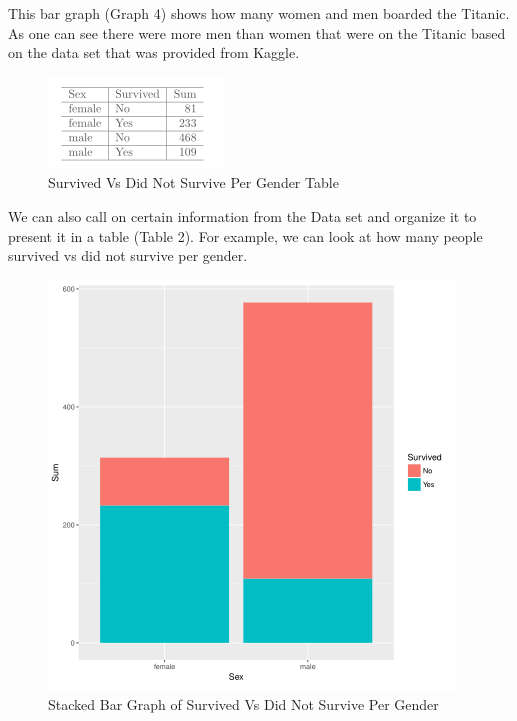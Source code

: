 \documentclass[sigconf]{acmart}
\begin{document}
This bar graph (Graph 4) shows how many women and men boarded the Titanic. As one can see there were more men than women that were on the Titanic based on the data set that was provided from Kaggle.

\begin{figure}[htb]
  \centering
  \includegraphics[width=1.0\columnwidth]{paper2/Table 2.png}
  \caption{Survived Vs Did Not Survive Per Gender Table
  \cite{Tibenkana and Driscoll, Data Set from Kaggle}}
  \label{fig:Table 2} 
\end{figure}

We can also call on certain information from the Data set and organize it to present it in a table (Table 2). For example, we can look at how many people survived vs did not survive per gender.

\begin{figure}[htb]
  \centering
  \includegraphics[width=1.0\columnwidth]{paper2/Graph 5.png}
  \caption{Stacked Bar Graph of Survived Vs Did Not Survive Per Gender
  \cite{Tibenkana and Driscoll, Data Set from Kaggle}}
  \label{fig:Graph 5} 
\end{figure}
\end{document}
